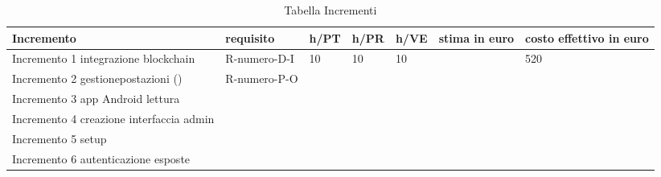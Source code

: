 \hypertarget{TabellaIncrementi}{}
\begin{longtable}{ C{0.15\textwidth} C{0.15\textwidth} C{0.1\textwidth} C{0.1\textwidth} C{0.1\textwidth} C{0.1\textwidth} C{0.1\textwidth} }
    \caption{Tabella Incrementi}                                                                                 \\
    \rowcolor{\primaryColor}
    \textcolor{\secondaryColor}{\textbf{Incremento}} & \textcolor{\secondaryColor}{\textbf{requisito}}& \textcolor{\secondaryColor}{\textbf{h/PT}} & \textcolor{\secondaryColor}{\textbf{h/PR}}& \textcolor{\secondaryColor}{\textbf{h/VE}}& \textcolor{\secondaryColor}{\textbf{stima in euro}}&\textcolor{\secondaryColor}{\textbf{costo effettivo in euro}}\\ \endhead
    {Incremento 1 integrazione blockchain} & {R-numero-D-I } & {10 } & {10}& {10}& {}& {520}\\
    {Incremento 2 gestionepostazioni ()} & {R-numero-P-O} & { }& {}& {}& {}& {} \\
    {Incremento 3 app Android lettura } & {} & {}& {}& {}& {}& {}\\
    {Incremento 4 creazione interfaccia admin} & {} & {}& {}& {}& {}& {}\\
    {Incremento 5 setup   } & {} & {}& {}& {}& {}& {}\\
    {Incremento 6 autenticazione  esposte} & {} & {}& {}& {}& {}& {}\\
\end{longtable}


